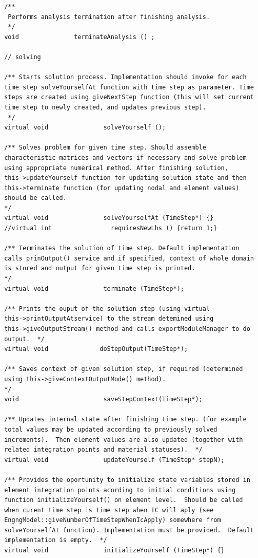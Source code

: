 \documentclass[a4paper]{article}
\begin{document}
{\begin{verbatim}
 /**
  Performs analysis termination after finishing analysis.  
  */
 void               terminateAnalysis () ;
  
 // solving

 /** Starts solution process. Implementation should invoke for each
 time step solveYourselfAt function with time step as parameter. Time
 steps are created using giveNextStep function (this will set current
 time step to newly created, and updates previous step).
  */
 virtual void               solveYourself ();

 /** Solves problem for given time step. Should assemble
 characteristic matrices and vectors if necessary and solve problem
 using appropriate numerical method. After finishing solution,
 this->updateYourself function for updating solution state and then
 this->terminate function (for updating nodal and element values)
 should be called.  
 */
 virtual void               solveYourselfAt (TimeStep*) {}
 //virtual int                requiresNewLhs () {return 1;}

 /** Terminates the solution of time step. Default implementation
 calls prinOutput() service and if specified, context of whole domain
 is stored and output for given time step is printed.  
 */
 virtual void               terminate (TimeStep*);

 /** Prints the ouput of the solution step (using virtual
 this->printOutputAtservice) to the stream detemined using
 this->giveOutputStream() method and calls exportModuleManager to do
 output.  */
 virtual void              doStepOutput(TimeStep*);

 /** Saves context of given solution step, if required (determined
 using this->giveContextOutputMode() method).  
 */
 void                       saveStepContext(TimeStep*);

 /** Updates internal state after finishing time step. (for example
 total values may be updated according to previously solved
 increments).  Then element values are also updated (together with
 related integration points and material statuses).  */
 virtual void               updateYourself (TimeStep* stepN);

 /** Provides the oportunity to initialize state variables stored in
 element integration points acording to initial conditions using
 function initializeYourself() on element level.  Should be called
 when curent time step is time step when IC will aply (see
 EngngModel::giveNumberOfTimeStepWhenIcApply) somewhere from
 solveYourselfAt function). Implementation must be provided.  Default
 implementation is empty.  */
 virtual void               initializeYourself (TimeStep*) {}


\end{verbatim}}
\end{document}

